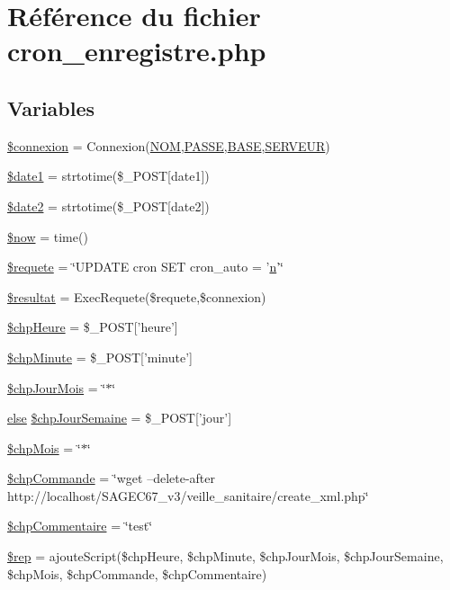 \hypertarget{cron__enregistre_8php}{
\section{R\'{e}f\'{e}rence du fichier cron\_\-enregistre.php}
\label{cron__enregistre_8php}
}
\subsection*{Variables}
\begin{CompactItemize}
\item 
\hyperlink{cron__enregistre_8php_a0}{\$connexion} = Connexion(\hyperlink{pma__connect_8php_a0}{NOM},\hyperlink{pma__connect_8php_a1}{PASSE},\hyperlink{pma__connect_8php_a3}{BASE},\hyperlink{pma__connect_8php_a2}{SERVEUR})
\item 
\hyperlink{cron__enregistre_8php_a1}{\$date1} = strtotime(\$\_\-POST\mbox{[}date1\mbox{]})
\item 
\hyperlink{cron__enregistre_8php_a2}{\$date2} = strtotime(\$\_\-POST\mbox{[}date2\mbox{]})
\item 
\hyperlink{cron__enregistre_8php_a3}{\$now} = time()
\item 
\hyperlink{cron__enregistre_8php_a4}{\$requete} = \char`\"{}UPDATE cron SET cron\_\-auto = '\hyperlink{utilitaires_2html_8php_a0}{n}'\char`\"{}
\item 
\hyperlink{cron__enregistre_8php_a5}{\$resultat} = Exec\-Requete(\$requete,\$connexion)
\item 
\hyperlink{cron__enregistre_8php_a6}{\$chp\-Heure} = \$\_\-POST\mbox{[}'heure'\mbox{]}
\item 
\hyperlink{cron__enregistre_8php_a7}{\$chp\-Minute} = \$\_\-POST\mbox{[}'minute'\mbox{]}
\item 
\hyperlink{cron__enregistre_8php_a8}{\$chp\-Jour\-Mois} = \char`\"{}$\ast$\char`\"{}
\item 
\hyperlink{cron_8php_a9}{else} \hyperlink{cron__enregistre_8php_a9}{\$chp\-Jour\-Semaine} = \$\_\-POST\mbox{[}'jour'\mbox{]}
\item 
\hyperlink{cron__enregistre_8php_a10}{\$chp\-Mois} = \char`\"{}$\ast$\char`\"{}
\item 
\hyperlink{cron__enregistre_8php_a11}{\$chp\-Commande} = \char`\"{}wget --delete-after http://localhost/SAGEC67\_\-v3/veille\_\-sanitaire/create\_\-xml.php\char`\"{}
\item 
\hyperlink{cron__enregistre_8php_a12}{\$chp\-Commentaire} = \char`\"{}test\char`\"{}
\item 
\hyperlink{cron__enregistre_8php_a13}{\$rep} = ajoute\-Script(\$chp\-Heure, \$chp\-Minute, \$chp\-Jour\-Mois, \$chp\-Jour\-Semaine, \$chp\-Mois, \$chp\-Commande, \$chp\-Commentaire)
\end{CompactItemize}


